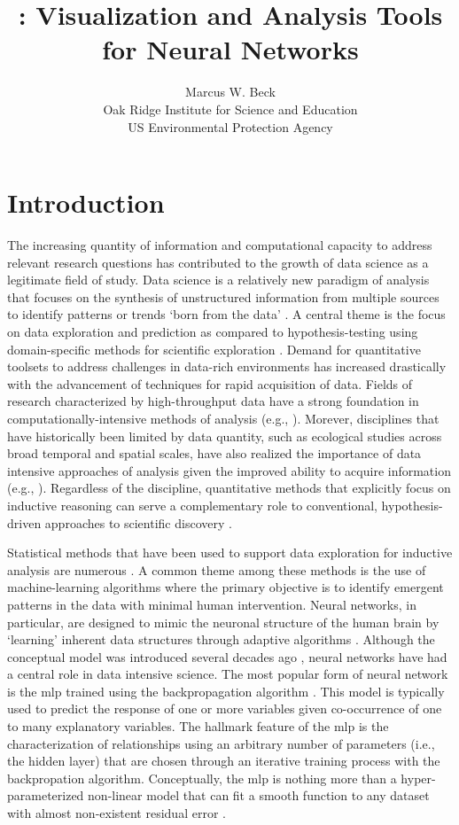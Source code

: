 \documentclass[article,shortnames]{jss}\usepackage[]{graphicx}\usepackage[]{color}
\author{Marcus W. Beck\\Oak Ridge Institute for Science and Education\\US Environmental Protection Agency}
\title{\pkg{NeuralNetTools}: Visualization and Analysis Tools for Neural Networks}
\begin{document}

\section[Introduction]{Introduction}

The increasing quantity of information and computational capacity to address relevant research questions has contributed to the growth of data science as a legitimate field of study.   Data science is a relatively new paradigm of analysis that focuses on the synthesis of unstructured information from multiple sources to identify patterns or trends `born from the data' \citep{Kelling09}.  A central theme is the focus on data exploration and prediction as compared to hypothesis-testing using domain-specific methods for scientific exploration \citep{Kell03}.  Demand for quantitative toolsets to address challenges in data-rich environments has increased drastically with the advancement of techniques for rapid acquisition of data. Fields of research characterized by high-throughput data have a strong foundation in computationally-intensive methods of analysis (e.g., \citet{Saeys07}).  Morever, disciplines that have historically been limited by data quantity, such as ecological studies across broad temporal and spatial scales, have also realized the importance of data intensive approaches of analysis given the improved ability to acquire information (e.g., \citet{Swanson15}).  Regardless of the discipline, quantitative methods that explicitly focus on inductive reasoning can serve a complementary role to conventional, hypothesis-driven approaches to scientific discovery \citep{Kell03}.  

Statistical methods that have been used to support data exploration for inductive analysis are numerous \citep{Jain00}.  A common theme among these methods is the use of machine-learning algorithms where the primary objective is to identify emergent patterns in the data with minimal human intervention.  Neural networks, in particular, are designed to mimic the neuronal structure of the human brain by `learning' inherent data structures through adaptive algorithms \citep{Rumelhart86,Ripley96}.  Although the conceptual model was introduced several decades ago \citep{McCulloch43}, neural networks have had a central role in data intensive science.  The most popular form of neural network is the \ac{mlp} trained using the backpropagation algorithm \citep{Rumelhart86}.  This model is typically used to predict the response of one or more variables given co-occurrence of one to many explanatory variables.  The hallmark feature of the \ac{mlp} is the characterization of relationships using an arbitrary number of parameters (i.e., the hidden layer) that are chosen through an iterative training process with the backpropation algorithm.  Conceptually, the \ac{mlp} is nothing more than a hyper-parameterized non-linear model that can fit a smooth function to any dataset with almost non-existent residual error \citep{Hornik91}.
\end{document}
